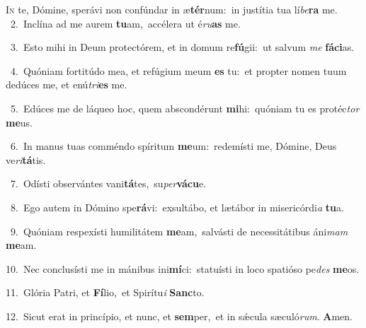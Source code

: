 \lettrine{\initial\textcolor{\initialcolor}{I}}{n} te, Dómine, sperávi non confúndar in æ\-\textbf{tér}\-num:~\star in justítia tua lí\-\textit{be}\-\textbf{ra} me.\\
{\numbfont\textcolor{\numbcolor}{~2.}}~Inclína ad me aurem \textbf{tu}\-am,~\star accélera ut é\-\textit{ru}\-\textbf{as} me.\par
{\numbfont\textcolor{\numbcolor}{~3.}}~Esto mihi in Deum protectórem, et in domum re\-\textbf{fú}\-gii:~\star ut salvum \textit{me} \textbf{fá}\-\textbf{ci}as.\par
{\numbfont\textcolor{\numbcolor}{~4.}}~Quóniam fortitúdo mea, et refúgium meum \textbf{es} tu:~\star et propter nomen tuum dedúces me, et enú\-\textit{tri}\-\textbf{es} me.\par
{\numbfont\textcolor{\numbcolor}{~5.}}~Edúces me de láqueo hoc, quem abscondérunt \textbf{mi}\-hi:~\star quóniam tu es protéc\textit{tor} \textbf{me}\-us.\par
{\numbfont\textcolor{\numbcolor}{~6.}}~In manus tuas comméndo spíritum \textbf{me}\-um:~\star redemísti me, Dómine, Deus ve\-\textit{ri}\-\textbf{tá}tis.\par
{\numbfont\textcolor{\numbcolor}{~7.}}~Odísti observántes vani\-\textbf{tá}\-tes,~\star su\-\textit{per}\-\textbf{vá}\textbf{cu}e.\par
{\numbfont\textcolor{\numbcolor}{~8.}}~Ego autem in Dómino spe\-\textbf{rá}\-vi:~\star exsultábo, et lætábor in misericórdi\textit{a} \textbf{tu}\-a.\par
{\numbfont\textcolor{\numbcolor}{~9.}}~Quóniam respexísti humilitátem \textbf{me}\-am,~\star salvásti de necessitátibus áni\textit{mam} \textbf{me}\-am.\par
{\numbfont\textcolor{\numbcolor}{10.}}~Nec conclusísti me in mánibus ini\-\textbf{mí}\-ci:~\star statuísti in loco spatióso pe\textit{des} \textbf{me}\-os.\par
{\numbfont\textcolor{\numbcolor}{11.}}~Glória Patri, et \textbf{Fí}\-lio,~\star et Spirítu\textit{i} \textbf{Sanc}\-to.\par
{\numbfont\textcolor{\numbcolor}{12.}}~Sicut erat in princípio, et nunc, et \textbf{sem}\-per,~\star et in sǽcula sæculó\-\textit{rum}\-. \textbf{A}\-men.\par
